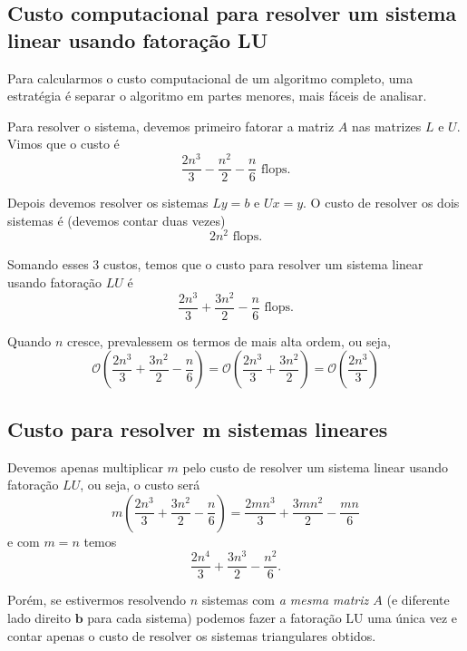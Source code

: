 \subsection{Custo computacional para resolver um sistema linear usando fatoração LU}
Para calcularmos o custo computacional de um algoritmo completo, uma estratégia é separar o algoritmo em partes menores, mais fáceis de analisar.

Para resolver o sistema, devemos primeiro fatorar a matriz $A$ nas matrizes $L$ e $U$. Vimos que o custo é
\begin{equation} \frac{2n^3}{3}-\frac{n^2}{2}-\frac{n}{6} \text{~flops}. \end{equation}

Depois devemos resolver os sistemas $Ly=b$ e $Ux=y$. O custo de resolver os dois sistemas é (devemos contar duas vezes)
\begin{equation}  2 n^2\text{~flops}. \end{equation}

Somando esses $3$ custos, temos que o custo para resolver um sistema linear usando fatoração $LU$ é
\begin{equation} \frac{2n^3}{3}+\frac{3n^2}{2}-\frac{n}{6} \text{~flops}. \end{equation}

Quando $n$ cresce, prevalessem os termos de mais alta ordem, ou seja,
\begin{equation} \mathcal{O}(\frac{2n^3}{3}+\frac{3n^2}{2}-\frac{n}{6}) = \mathcal{O}(\frac{2n^3}{3}+\frac{3n^2}{2})=\mathcal{O}(\frac{2n^3}{3}) \end{equation}

\subsection{Custo para resolver m sistemas lineares}
Devemos apenas multiplicar $m$ pelo custo de resolver um sistema linear usando fatoração $LU$, ou seja, o custo será
\begin{equation} m(\frac{2n^3}{3}+\frac{3n^2}{2}-\frac{n}{6})=\frac{2mn^3}{3}+\frac{3mn^2}{2}-\frac{mn}{6} \end{equation}
e com $m=n$ temos
\begin{equation} \frac{2n^4}{3}+\frac{3n^3}{2}-\frac{n^2}{6}. \end{equation}

Porém, se estivermos resolvendo $n$ sistemas com \textit{a mesma matriz $A$ }(e diferente lado direito $\pmb b$ para cada sistema) podemos fazer a fatoração LU uma única vez e contar apenas o custo de resolver os sistemas triangulares obtidos.

